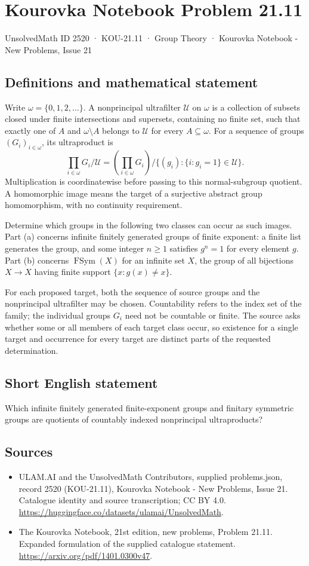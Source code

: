\documentclass[11pt,a4paper]{article}
\begin{document}
\section*{Kourovka Notebook Problem 21.11}\label{2520}
{\small UnsolvedMath ID 2520 · KOU-21.11 · Group Theory · Kourovka Notebook - New Problems, Issue 21}
\subsection{Definitions and mathematical statement}
Write $\omega=\{0,1,2,\ldots\}$. A nonprincipal ultrafilter $\mathcal U$
on $\omega$ is a collection of subsets closed under finite intersections
and supersets, containing no finite set, such that exactly one of $A$
and $\omega\setminus A$ belongs to $\mathcal U$ for every $A\subseteq\omega$.
For a sequence of groups $(G_i)_{i\in\omega}$, its ultraproduct is
\[
 \prod_{i\in\omega}G_i/\mathcal U
 =\left(\prod_{i\in\omega}G_i\right)/
   \{(g_i):\{i:g_i=1\}\in\mathcal U\}.
\]
Multiplication is coordinatewise before passing to this normal-subgroup
quotient. A homomorphic image means the target of a surjective abstract
group homomorphism, with no continuity requirement.

Determine which groups in the following two classes can occur as such
images. Part (a) concerns infinite finitely generated groups of finite
exponent: a finite list generates the group, and some integer $n\ge1$
satisfies $g^n=1$ for every element $g$. Part (b) concerns
$\operatorname{FSym}(X)$ for an infinite set $X$, the group of all
bijections $X\to X$ having finite support $\{x:g(x)\ne x\}$.

For each proposed target, both the sequence of source groups and the
nonprincipal ultrafilter may be chosen. Countability refers to the
index set of the family; the individual groups $G_i$ need not be
countable or finite. The source asks whether some or all members of
each target class occur, so existence for a single target and occurrence
for every target are distinct parts of the requested determination.
\subsection{Short English statement}
Which infinite finitely generated finite-exponent groups and finitary symmetric groups are quotients of countably indexed nonprincipal ultraproducts?
\subsection{Sources}
\begin{itemize}
\item[S1] ULAM.AI and the UnsolvedMath Contributors, supplied problems.json, record 2520 (KOU-21.11), Kourovka Notebook - New Problems, Issue 21. Catalogue identity and source transcription; CC BY 4.0.
\url{https://huggingface.co/datasets/ulamai/UnsolvedMath}.
\item[S2] The Kourovka Notebook, 21st edition, new problems, Problem 21.11. Expanded formulation of the supplied catalogue statement.
\url{https://arxiv.org/pdf/1401.0300v47}.
\end{itemize}
\end{document}
